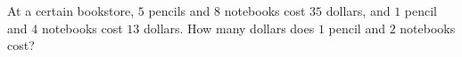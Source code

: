 At a certain bookstore, $5$ pencils and $8$ notebooks cost $35$ dollars, and $1$ pencil and $4$ notebooks cost $13$ dollars. How many dollars does $1$ pencil and $2$ notebooks cost?
